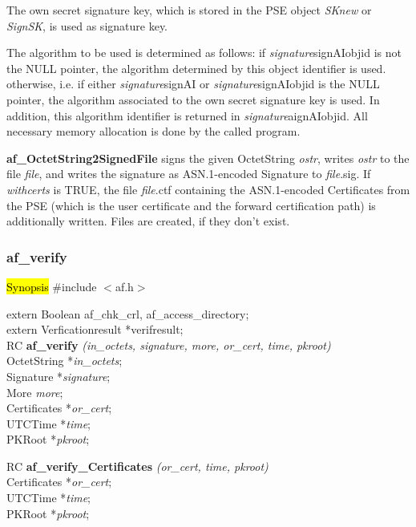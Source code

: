The own secret signature key, which is stored in the PSE
object {\em SKnew} or {\em SignSK}, is used as signature key. 

The algorithm to be used is determined as follows:
\be
\m if {\em signature}\pf signAI\pf objid is not the NULL pointer, the algorithm
   determined by this object identifier is used.
\m otherwise, i.e. if either {\em signature}\pf signAI or {\em signature}\pf signAI\pf objid 
   is the NULL pointer, the algorithm
   associated to the own secret signature key is used.
   In addition, this algorithm identifier is returned in {\em signature}\pf aignAI\pf objid.
   All necessary memory allocation is done by the called program.
\ee

{\bf af\_OctetString2SignedFile} signs the given OctetString {\em ostr}, writes {\em ostr}
to the file {\em file}, and writes the signature as ASN.1-encoded Signature to {\em file}.sig.
If {\em withcerts} is TRUE, the file {\em file}.ctf containing the ASN.1-encoded Certificates
from the PSE (which is the user certificate and the forward certification path) is additionally
written. Files are created, if they don't exist.

\subsubsection{af\_verify}
\label{af_verify}
\hl{Synopsis}
\#include $<$af.h$>$ 

extern Boolean af\_chk\_crl, af\_access\_directory; \\
extern Verficationresult *verifresult; \\ [1em]
RC {\bf af\_verify} {\em (in\_octets, signature, more, or\_cert, time, pkroot)} \\
OctetString *{\em in\_octets}; \\
Signature *{\em signature}; \\
More {\em more}; \\
Certificates *{\em or\_cert}; \\
UTCTime *{\em time}; \\
PKRoot *{\em pkroot};

RC {\bf af\_verify\_Certificates} {\em (or\_cert, time, pkroot)} \\
Certificates *{\em or\_cert}; \\
UTCTime *{\em time}; \\
PKRoot *{\em pkroot};

